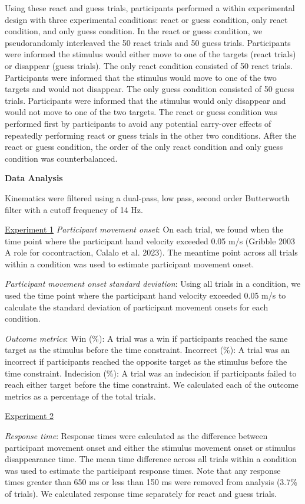 \documentclass[12pt,letterpaper]{article}
\begin{document}
Using these react and guess trials, participants performed a within experimental design with three experimental conditions: react or guess condition, only react condition, and only guess condition. In the react or guess condition, we pseudorandomly interleaved the 50 react trials and 50 guess trials. Participants were informed the stimulus would either move to one of the targets (react trials) or disappear (guess trials). The only react condition consisted of 50 react trials. Participants were informed that the stimulus would move to one of the two targets and would not disappear. The only guess condition consisted of 50 guess trials. Participants were informed that the stimulus would only disappear and would not move to one of the two targets. The react or guess condition was performed first by participants to avoid any potential carry-over effects of repeatedly performing react or guess trials in the other two conditions. After the react or guess condition, the order of the only react condition and only guess condition was counterbalanced.

\noindent\textbf{\large\textcolor{mydarkblue}{Data Analysis}}

Kinematics were filtered using a dual-pass, low pass, second order Butterworth filter with a cutoff frequency of 14 Hz.

\underline{Experiment 1}
\emph{Participant movement onset}: On each trial, we found when the time point where the participant hand velocity exceeded 0.05 m/s (Gribble 2003 A role for cocontraction, Calalo et al. 2023). The meantime point across all trials within a condition was used to estimate participant movement onset.

\emph{Participant movement onset standard deviation}: Using all trials in a condition, we used the time point where the participant hand velocity exceeded 0.05 m/s to calculate the standard deviation of participant movement onsets for each condition.

\emph{Outcome metrics}: Win (\%): A trial was a win if participants reached the same target as the stimulus before the time constraint. Incorrect (\%): A trial was an incorrect if participants reached the opposite target as the stimulus before the time constraint. Indecision (\%): A trial was an indecision if participants failed to reach either target before the time constraint. We calculated each of the outcome metrics as a percentage of the total trials.

\noindent\underline{Experiment 2}

\emph{Response time}: Response times were calculated as the difference between participant movement onset and either the stimulus movement onset or stimulus disappearance time. The mean time difference across all trials within a condition was used to estimate the participant response times. Note that any response times greater than 650 ms or less than 150 ms were removed from analysis (3.7\% of trials). We calculated response time separately for react and guess trials.
\end{document}
